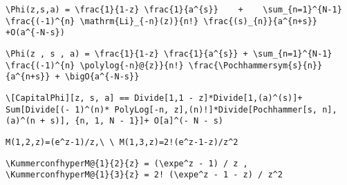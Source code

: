 \newsavebox\BJT
\begin{lrbox}{\BJT}
 \begin{minipage}[t]{0.82\textwidth}
  \lstinline[language={[latex]TeX},mathescape,breaklines=true]"\Phi(z,s,a) = \frac{1}{1-z} \frac{1}{a^{s}}    +    \sum_{n=1}^{N-1} \frac{(-1)^{n} \mathrm{Li}_{-n}(z)}{n!} \frac{(s)_{n}}{a^{n+s}}    +O(a^{-N-s})"
 \end{minipage}
\end{lrbox}
\newsavebox\BJST
\begin{lrbox}{\BJST}
 \begin{minipage}[t]{0.82\textwidth}
  \lstinline[language={[latex]TeX},mathescape,breaklines=true]"\Phi(z , s , a) = \frac{1}{1-z} \frac{1}{a^{s}} + \sum_{n=1}^{N-1} \frac{(-1)^{n} \polylog{-n}@{z}}{n!} \frac{\Pochhammersym{s}{n}}{a^{n+s}} + \bigO{a^{-N-s}}"
 \end{minipage}
\end{lrbox}
\newsavebox\BJMM
\begin{lrbox}{\BJMM}
 \begin{minipage}[t]{0.82\textwidth}
  \lstinline[language={[latex]TeX},mathescape,breaklines=true]"\[CapitalPhi][z, s, a] == Divide[1,1 - z]*Divide[1,(a)^(s)]+ Sum[Divide[(- 1)^(n)* PolyLog[-n, z],(n)!]*Divide[Pochhammer[s, n],(a)^(n + s)], {n, 1, N - 1}]+ O[a]^(- N - s)"
 \end{minipage}
\end{lrbox}
\newsavebox\BJMA
\begin{lrbox}{\BJMA}
 \begin{minipage}[t]{0.82\textwidth}
  \lstinline[language={[latex]TeX},mathescape,breaklines=true]""
 \end{minipage}
\end{lrbox}
\newsavebox\BKT
\begin{lrbox}{\BKT}
 \begin{minipage}[t]{0.82\textwidth}
  \lstinline[language={[latex]TeX},mathescape,breaklines=true]"M(1,2,z)=(e^z-1)/z,\ \ M(1,3,z)=2!(e^z-1-z)/z^2"
 \end{minipage}
\end{lrbox}
\newsavebox\BKST
\begin{lrbox}{\BKST}
 \begin{minipage}[t]{0.82\textwidth}
  \lstinline[language={[latex]TeX},mathescape,breaklines=true]"\KummerconfhyperM@{1}{2}{z} = (\expe^z - 1) / z , \KummerconfhyperM@{1}{3}{z} = 2! (\expe^z - 1 - z) / z^2"
 \end{minipage}
\end{lrbox}
